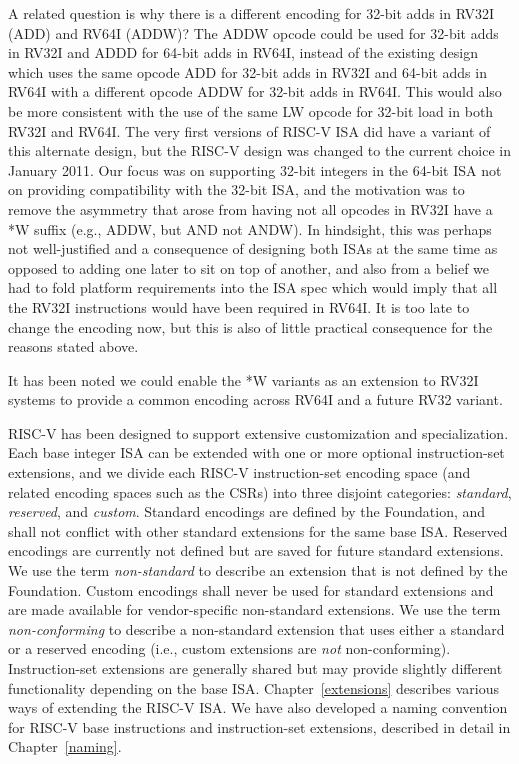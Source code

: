 \begin{commentary}
A related question is why there is a different encoding for 32-bit
adds in RV32I (ADD) and RV64I (ADDW)? The ADDW opcode could be used
for 32-bit adds in RV32I and ADDD for 64-bit adds in RV64I, instead of
the existing design which uses the same opcode ADD for 32-bit adds in
RV32I and 64-bit adds in RV64I with a different opcode ADDW for 32-bit
adds in RV64I.  This would also be more consistent with the use of the
same LW opcode for 32-bit load in both RV32I and RV64I.  The very
first versions of RISC-V ISA did have a variant of this alternate
design, but the RISC-V design was changed to the current choice in
January 2011.  Our focus was on supporting 32-bit integers in the
64-bit ISA not on providing compatibility with the 32-bit ISA, and the
motivation was to remove the asymmetry that arose from having not all
opcodes in RV32I have a *W suffix (e.g., ADDW, but AND not ANDW).  In
hindsight, this was perhaps not well-justified and a consequence of
designing both ISAs at the same time as opposed to adding one later to
sit on top of another, and also from a belief we had to fold platform
requirements into the ISA spec which would imply that all the RV32I
instructions would have been required in RV64I.  It is too late to
change the encoding now, but this is also of little practical
consequence for the reasons stated above.

It has been noted we could enable the *W variants as an extension to
RV32I systems to provide a common encoding across RV64I and a future
RV32 variant.
\end{commentary}

RISC-V has been designed to support extensive customization and
specialization.  Each base integer ISA can be extended with one or
more optional instruction-set extensions, and we divide each RISC-V
instruction-set encoding space (and related encoding spaces such as
the CSRs) into three disjoint categories: {\em standard}, {\em
  reserved}, and {\em custom}.  Standard encodings are defined by the
Foundation, and shall not conflict with other standard extensions for
the same base ISA.  Reserved encodings are currently not defined but
are saved for future standard extensions.  We use the term {\em
  non-standard} to describe an extension that is not defined by the
Foundation.  Custom encodings shall never be used for standard
extensions and are made available for vendor-specific non-standard
extensions.  We use the term {\em non-conforming} to describe a
non-standard extension that uses either a standard or a reserved
encoding (i.e., custom extensions are {\em not} non-conforming).
Instruction-set extensions are generally shared but may provide slightly different
functionality depending on the base ISA.  Chapter~\ref{extensions}
describes various ways of extending the RISC-V ISA.  We have also
developed a naming convention for RISC-V base instructions and
instruction-set extensions, described in detail in
Chapter~\ref{naming}.

